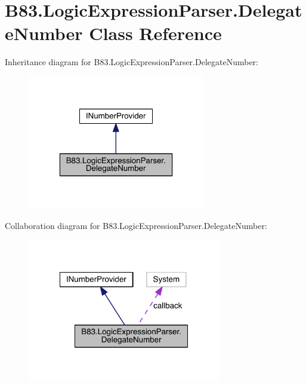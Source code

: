 \hypertarget{class_b83_1_1_logic_expression_parser_1_1_delegate_number}{}\section{B83.\+Logic\+Expression\+Parser.\+Delegate\+Number Class Reference}
\label{class_b83_1_1_logic_expression_parser_1_1_delegate_number}


Inheritance diagram for B83.\+Logic\+Expression\+Parser.\+Delegate\+Number\+:\nopagebreak
\begin{figure}[H]
\begin{center}
\leavevmode
\includegraphics[width=220pt]{class_b83_1_1_logic_expression_parser_1_1_delegate_number__inherit__graph}
\end{center}
\end{figure}


Collaboration diagram for B83.\+Logic\+Expression\+Parser.\+Delegate\+Number\+:\nopagebreak
\begin{figure}[H]
\begin{center}
\leavevmode
\includegraphics[width=239pt]{class_b83_1_1_logic_expression_parser_1_1_delegate_number__coll__graph}
\end{center}
\end{figure}
